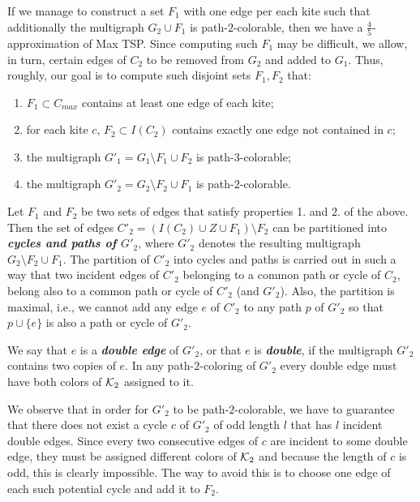 \documentclass[a4, 11pt]{article}
\newcommand{\<}{\langle}
\renewcommand{\>}{\rangle}
\newcommand{\Kd}{{\cal K}_2}
\begin{document}
If we manage to construct a set $F_1$ with one edge per each kite such that additionally the multigraph $G_2 \cup F_1$ is path-$2$-colorable, then we have a $\frac 45$-approximation of Max TSP. Since computing such $F_1$ may be difficult, we allow, in turn, certain edges of $C_2$ to be removed from $G_2$ and added to $G_1$. Thus, roughly,  our goal is to compute such disjoint sets $F_1, F_2$ that:

\begin{enumerate}

\item $F_1 \subset C_{max}$ contains at least  one edge of each kite;
\item for each kite $c$, $F_2 \subset I(C_2)$ contains exactly one edge not contained in $c$; 
\item the multigraph $G'_1=G_1 \setminus F_1 \cup F_2$ is path-$3$-colorable;
\item the multigraph $G'_2=G_2 \setminus F_2 \cup F_1$ is path-$2$-colorable.
\end{enumerate} 


Let $F_1$ and $F_2$ be two sets of edges that satisfy properties 1. and 2. of the above. Then  the set of edges $C'_2=(I(C_2) \cup Z \cup F_1) \setminus F_2$  can be partitioned into {\bf \em cycles and paths of $G'_2$}, where $G'_2$ denotes the resulting multigraph $G_2 \setminus F_2 \cup F_1$.  The partition of $C'_2$ into cycles and paths is carried out in such a way that two incident edges of $C'_2$ belonging to a common path or cycle of $C_2$, belong also to a common path or cycle of $C'_2$ (and $G'_2$). Also, the partition is maximal, i.e., we cannot
add any edge $e$ of $C'_2$ to any path $p$ of $G'_2$ so that $p \cup \{e\}$ is also a path or cycle of $G'_2$.

We say that $e$ is a {\bf \em double edge} of $G'_2$, or that $e$ is {\bf \em double}, if the multigraph $G'_2$ contains two copies of $e$. In any path-$2$-coloring of $G'_2$ every double edge must have both colors of $\Kd$ assigned to it. 

We observe that in order for $G'_2$ to be path-$2$-colorable,  we have to guarantee that  there does not exist   a cycle
$c$  of $G'_2$ of odd length $l$ that  has $l$ incident double edges. Since every two consecutive edges of $c$ are incident to some double edge, they must be assigned different colors of $\Kd$ and because the length of $c$ is odd, this is clearly impossible. The way to avoid 
this is to choose one edge of each such potential cycle and add it to $F_2$. 
\end{document}
